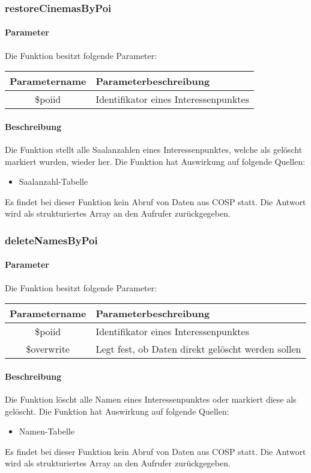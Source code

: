 \subsubsection{restoreCinemasByPoi}
\paragraph{Parameter} Die Funktion besitzt folgende Parameter:
\begin{table}[H]
	\begin{tabular}{|c|p{11cm}|}
		\hline
		\textbf{Parametername} & \textbf{Parameterbeschreibung} \\ \hline
		\$poiid     & Identifikator eines Interessenpunktes \\ \hline
	\end{tabular}
\end{table}
\paragraph{Beschreibung} Die Funktion stellt alle Saalanzahlen eines Interessenpunktes, welche als gelöscht markiert wurden, wieder her. Die Funktion hat Auswirkung auf folgende Quellen:
\begin{itemize}
	\item Saalanzahl-Tabelle
\end{itemize}
Es findet bei dieser Funktion kein Abruf von Daten aus {\glqq COSP\grqq} statt. Die Antwort wird als strukturiertes Array an den Aufrufer zurückgegeben.
\subsubsection{deleteNamesByPoi}
\paragraph{Parameter} Die Funktion besitzt folgende Parameter:
\begin{table}[H]
	\begin{tabular}{|c|p{11cm}|}
		\hline
		\textbf{Parametername} & \textbf{Parameterbeschreibung} \\ \hline
		\$poiid     & Identifikator eines Interessenpunktes \\ \hline
		\$overwrite & Legt fest, ob Daten direkt gelöscht werden sollen \\ \hline
	\end{tabular}
\end{table}
\paragraph{Beschreibung} Die Funktion löscht alle Namen eines Interessenpunktes oder markiert diese als gelöscht. Die Funktion hat Auswirkung auf folgende Quellen:
\begin{itemize}
	\item Namen-Tabelle
\end{itemize}
Es findet bei dieser Funktion kein Abruf von Daten aus {\glqq COSP\grqq} statt. Die Antwort wird als strukturiertes Array an den Aufrufer zurückgegeben.
